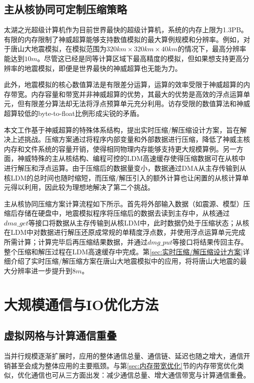 \documentclass[degree=doctor]{thuthesis}
\begin{document}
\subsection{主从核协同可定制压缩策略}
太湖之光超级计算机作为目前世界最快的超级计算机，系统的内存上限为1.3PB。有限的内存限制了神威超算能够支持数值模拟的最大算例规模和分辨率。例如，对于唐山大地震模拟，在模拟范围为$320km\times 320km \times 40km$的情况下，最高分辨率能达到$10m$。尽管这已经是同等计算区域下最高精度的模拟，但如果想支持更高分辨率的地震模拟，即便是世界最快的神威超算也无能为力。

此外，地震模拟的核心数值算法是有限差分运算，运算的效率受限于神威超算的内存带宽。内存容量和带宽并非神威超算的优势，其最大的优势是高效的浮点运算单元，但有限差分算法却无法将浮点预算单元充分利用。访存受限的数值算法和神威超算较低的byte-to-float比例形成尖锐的矛盾。

本文工作基于神威超算的特殊体系结构，提出实时压缩/解压缩设计方案，旨在解决上述挑战。压缩方案通过将程序内部变量和外部数据进行压缩，降低了神威主核内存和文件系统的容量开销，使得相同物理内存能够支持更大规模算例。另一方面，神威特殊的主从核结构、编程可控的LDM高速缓存使得压缩数据可在从核中进行解压和浮点运算。由于压缩后的数据量变小，数据通过DMA从主存传输到从核LDM的总时间也随时缩短，而压缩/解压引入的额外计算也让闲置的从核计算单元得以利用，因此较为理想地解决了第二个挑战。

主从核协同压缩方案计算流程如下所示。首先将外部输入数据（如震源、模型）压缩后存储在硬盘中，地震模拟程序将压缩后的数据去读到主存中，从核通过$dma\_get$等接口将数据从主存传输到从核LDM中，此时数据仍处于压缩状态；从核在LDM中对数据进行解压还原成常规的单精度浮点数，并使用浮点运算单元完成所需计算；计算完毕后再压缩结果数据，并通过$dmg\_put$等接口将结果传回主存。整个压缩和解压过程在LDM高速缓存中完成。第\ref{sec:实时压缩/解压缩设计方案}详细介绍了实时压缩/解压缩方案在唐山大地震模拟中的应用，将将唐山大地震的最大分辨率进一步提升到$8m$。

\section{大规模通信与IO优化方法}

\subsection{虚拟网格与计算通信重叠}
当并行规模逐渐扩展时，应用的整体通信总量、通信链、延迟也随之增大，通信开销甚至会成为整体应用的主要瓶颈。与第\ref{sec:内存带宽优化}节的内存带宽优化类似，优化通信也可从三方面出发：减少通信总量、增大通信带宽与计算通信重叠。
\end{document}
